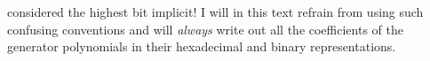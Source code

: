 considered the highest bit implicit! I will in this text refrain from
using such confusing conventions and will \textit{always} write out
all the coefficients of the generator polynomials in their hexadecimal
and binary representations.





\cite{gailly96:_zlib_compr_data_format_specif}

